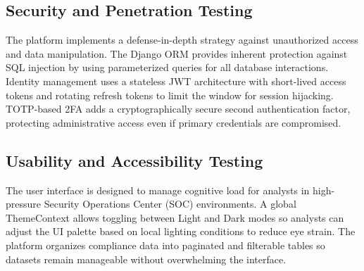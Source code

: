 \subsection{Security and Penetration Testing}
The platform implements a defense-in-depth strategy against unauthorized access and data manipulation. The Django ORM provides inherent protection against SQL injection by using parameterized queries for all database interactions. Identity management uses a stateless JWT architecture with short-lived access tokens and rotating refresh tokens to limit the window for session hijacking. TOTP-based 2FA adds a cryptographically secure second authentication factor, protecting administrative access even if primary credentials are compromised.

\begin{table}[H]
    \centering
    \caption{NFR-TC-03: Perimeter Defense and Vulnerability Prevention}
    \label{tab:nfr_tc_03}
    \renewcommand{\arraystretch}{1.4}
\end{table}

\subsection{Usability and Accessibility Testing}
The user interface is designed to manage cognitive load for analysts in high-pressure Security Operations Center (SOC) environments. A global ThemeContext allows toggling between Light and Dark modes so analysts can adjust the UI palette based on local lighting conditions to reduce eye strain. The platform organizes compliance data into paginated and filterable tables so datasets remain manageable without overwhelming the interface.

